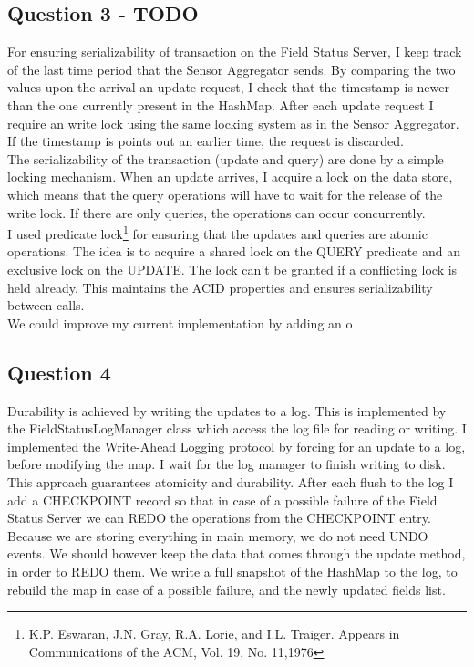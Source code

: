 \documentclass{article}      %
\begin{document}
\subsection* {Question 3 - TODO}

For ensuring serializability of transaction on the Field Status Server, I keep track of the last time period that the Sensor Aggregator sends. By comparing the two values upon the arrival an update request, I check that the timestamp is newer than the one currently present in the HashMap. After each update request I require an write lock using the same locking system as in the Sensor Aggregator. If the timestamp is points out an earlier time, the request is discarded. \\

The serializability of the transaction (update and query) are done by a simple locking mechanism. When an update arrives, I acquire a lock on the data store, which means that the query operations will have to wait for the release of the write lock. If there are only queries, the operations can occur concurrently.\\

I used predicate lock\footnote{K.P. Eswaran, J.N. Gray, R.A. Lorie, and I.L. Traiger.
Appears in Communications of the ACM, Vol. 19, No. 11,1976} for ensuring that the updates and queries are atomic operations.  The idea is to acquire a shared lock on the QUERY predicate and an exclusive lock on the UPDATE. The lock can't be granted if a conflicting lock is held already. This maintains the ACID properties and ensures serializability between calls.\\

We could improve my current implementation by adding an o

\subsection* {Question 4}

Durability is achieved by writing the updates to a log. This is implemented by the FieldStatusLogManager class which access the log file for reading or writing. I implemented the Write-Ahead Logging protocol by forcing for an update to a log, before modifying the map. I wait for the log manager to finish writing to disk. This approach guarantees atomicity and durability. After each flush to the log I add a CHECKPOINT record so that in case of a possible failure of the Field Status Server we can REDO the operations from the CHECKPOINT entry. Because we are storing everything in main memory, we do not need UNDO events. We should however keep the data that comes through the update method, in order to REDO them. We write a full snapshot of the HashMap to the log, to rebuild the map in case of a possible failure, and the newly updated fields list.\\
\end{document}
